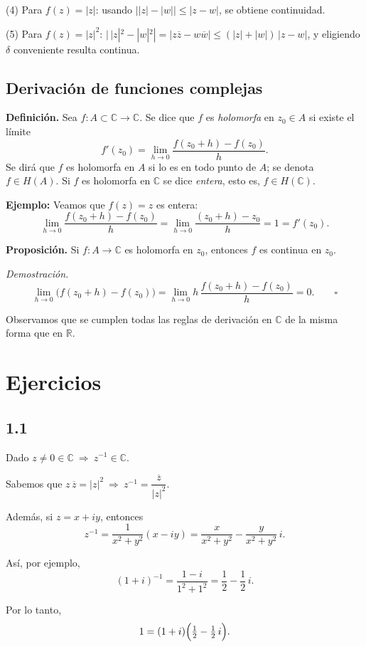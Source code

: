 \documentclass[a4paper,12pt]{article}
\begin{document}
(4) Para \(f(z)=|z|\): usando \(\big||z|-|w|\big|\le |z-w|\), se obtiene continuidad.

(5) Para \(f(z)=|z|^2\): \(|\,|z|^2-|w|^2|=|z\overline{z}-w\overline{w}|
\le (|z|+|w|)\,|z-w|\), y eligiendo \(\delta\) conveniente resulta continua.

\subsection{Derivación de funciones complejas}

\textbf{Definición.}
Sea \(f:A\subset\mathbb{C}\to\mathbb{C}\). Se dice que \(f\) es
\emph{holomorfa} en \(z_0\in A\) si existe el límite
\[
f'(z_0)=\lim_{h\to 0}\frac{f(z_0+h)-f(z_0)}{h}.
\]
Se dirá que \(f\) es holomorfa en \(A\) si lo es en todo punto de \(A\); se
denota \(f\in H(A)\).
Si \(f\) es holomorfa en \(\mathbb{C}\) se dice \emph{entera}, esto es,
\(f\in H(\mathbb{C})\).

\noindent\textbf{Ejemplo:}
Veamos que \(f(z)=z\) es entera:
\[
\lim_{h\to 0}\frac{f(z_0+h)-f(z_0)}{h}
=\lim_{h\to 0}\frac{(z_0+h)-z_0}{h}=1=f'(z_0).
\]

\textbf{Proposición.}
Si \(f:A\to\mathbb{C}\) es holomorfa en \(z_0\), entonces \(f\) es continua en \(z_0\).

\textit{Demostración.}
\[
\lim_{h\to 0}\bigl(f(z_0+h)-f(z_0)\bigr)
=\lim_{h\to 0}h\,\frac{f(z_0+h)-f(z_0)}{h}=0.
\qquad\square
\]

Observamos que se cumplen todas las reglas de derivación en \(\mathbb{C}\)
de la misma forma que en \(\mathbb{R}\).

\section*{Ejercicios}

\subsection*{1.1} Dado \(z\neq 0\in\mathbb{C}\ \Rightarrow\ z^{-1}\in\mathbb{C}\).

Sabemos que \(z\,\overline z=|z|^{2}\ \Rightarrow\ z^{-1}=\dfrac{\overline z}{|z|^{2}}\).

Además, si \(z=x+iy\), entonces
\[
z^{-1}=\frac{1}{x^{2}+y^{2}}(x-iy)
= \frac{x}{x^{2}+y^{2}}-\frac{y}{x^{2}+y^{2}}\,i .
\]

Así, por ejemplo,
\[
(1+i)^{-1}=\frac{1-i}{1^{2}+1^{2}}=\frac12-\frac12\,i .
\]

Por lo tanto,
\[
1=(1+i)\Bigl(\tfrac12-\tfrac12\,i\Bigr).
\]
\end{document}
